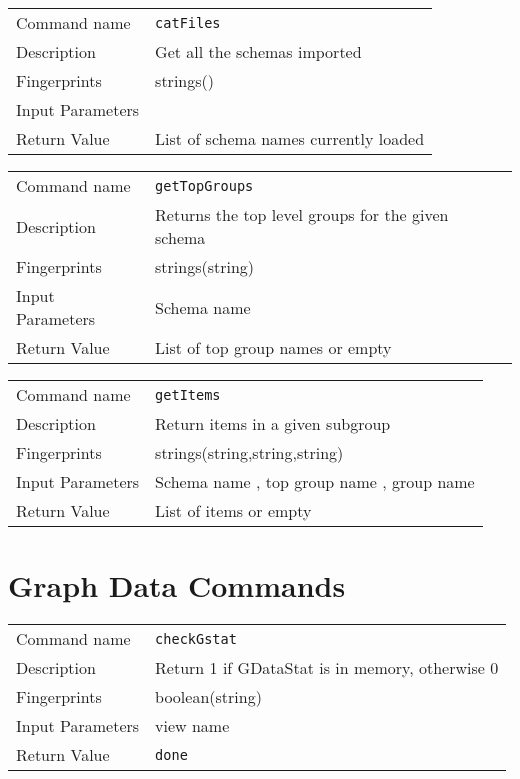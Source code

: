 \noindent
\begin{tabular}{l|p{5in}}
\hline
Command name &{\tt catFiles }\\ 
Description &
 Get all the schemas imported 
 	\\
Fingerprints & strings()\\
Input Parameters&\\
Return Value& List of schema names currently loaded \\
\hline
\end{tabular}
\bigskip

\noindent
\begin{tabular}{l|p{5in}}
\hline
Command name &{\tt getTopGroups }\\ 
Description &
 Returns the top level groups for the given schema 
 	\\
Fingerprints & strings(string)\\
Input Parameters& Schema name \\
Return Value& List of top group names or empty \\
\hline
\end{tabular}
\bigskip

\noindent
\begin{tabular}{l|p{5in}}
\hline
Command name &{\tt getItems }\\ 
Description &
 Return items in a given subgroup 
 	\\
Fingerprints & strings(string,string,string)\\
Input Parameters& Schema name , top group name , group name \\
Return Value& List of items or empty \\
\hline
\end{tabular}
\bigskip


\section{Graph Data Commands}
\noindent
\begin{tabular}{l|p{5in}}
\hline
Command name &{\tt checkGstat }\\ 
Description &
Return 1 if GDataStat is in memory, otherwise 0
 	\\
Fingerprints & boolean(string)\\
Input Parameters&view name\\
Return Value&{\tt done}\\
\hline
\end{tabular}
\bigskip

